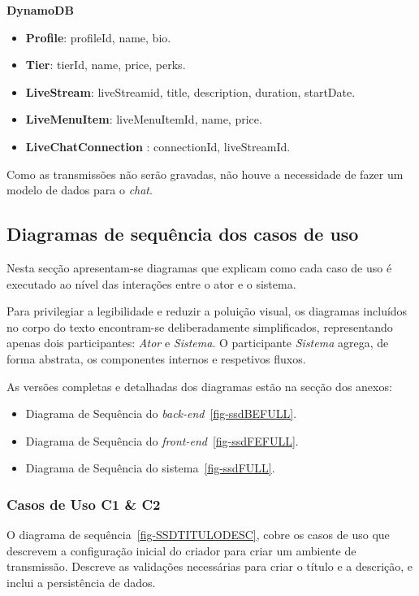 \textbf{DynamoDB}
\begin{itemize}
\item \textbf{Profile}: profileId, name, bio.
\item \textbf{Tier}: tierId, name, price, perks.
\item \textbf{LiveStream}: liveStreamid, title, description, duration, startDate.
\item \textbf{LiveMenuItem}: liveMenuItemId, name, price.
\item \textbf{LiveChatConnection} : connectionId, liveStreamId.
\end{itemize}

Como as transmissões não serão gravadas, não houve a necessidade de fazer um modelo de dados para o \textit{chat}.

\subsection{Diagramas de sequência dos casos de uso}


Nesta secção apresentam-se diagramas que explicam como cada caso de uso é executado ao nível das interações entre o ator e o sistema.

Para privilegiar a legibilidade e reduzir a poluição visual, os diagramas incluídos no corpo do texto encontram-se deliberadamente simplificados, representando apenas dois participantes: \textit{Ator} e \textit{Sistema}. O participante \textit{Sistema} agrega, de forma abstrata, os componentes internos e respetivos fluxos.

As versões completas e detalhadas dos diagramas estão na secção dos anexos:

\begin{itemize}
    \item Diagrama de Sequência do \textit{back-end}~\ref{fig-ssdBEFULL}.
    \item Diagrama de Sequência do \textit{front-end}~\ref{fig-ssdFEFULL}.
    \item Diagrama de Sequência do sistema~\ref{fig-ssdFULL}.
\end{itemize}

\subsubsection{Casos de Uso \textbf{C1} \& \textbf{C2}}

O diagrama de sequência~\ref{fig-SSDTITULODESC}, cobre os casos de uso que descrevem a configuração inicial do criador para criar um ambiente de transmissão. Descreve as validações necessárias para criar o título e a descrição, e inclui a persistência de dados.

